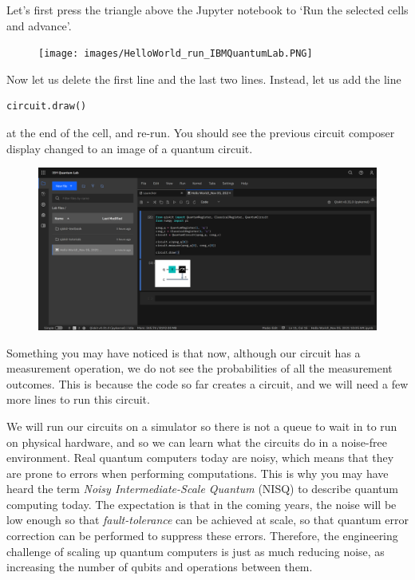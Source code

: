 \documentclass{article}
\theoremstyle{definition}
\begin{document}
Let's first press the triangle above the Jupyter notebook to `Run the selected cells and advance'.
\begin{figure}[H]
	\texttt{[image: images/HelloWorld\_run\_IBMQuantumLab.PNG]}
\end{figure}
Now let us delete the first line and the last two lines.  Instead, let us add the line
\begin{lstlisting}[language=Python]
	circuit.draw()
\end{lstlisting}
at the end of the cell, and re-run.  You should see the previous circuit composer display changed to an image of a quantum circuit.
\begin{figure}[H]
	\includegraphics[width=\columnwidth]{images/HelloWorld-2_IBMQuantumLab.PNG}
\end{figure}

Something you may have noticed is that now, although our circuit has a measurement operation, we do not see the probabilities of all the measurement outcomes.  This is because the code so far creates a circuit, and we will need a few more lines to run this circuit.

We will run our circuits on a simulator so there is not a queue to wait in to run on physical hardware, and so we can learn what the circuits do in a noise-free environment.  Real quantum computers today are noisy, which means that they are prone to errors when performing computations.  This is why you may have heard the term \textit{Noisy Intermediate-Scale Quantum} (NISQ) to describe quantum computing today.  The expectation is that in the coming years, the noise will be low enough so that \textit{fault-tolerance} can be achieved at scale, so that quantum error correction can be performed to suppress these errors.  Therefore, the engineering challenge of scaling up quantum computers is just as much reducing noise, as increasing the number of qubits and operations between them.
\end{document}
